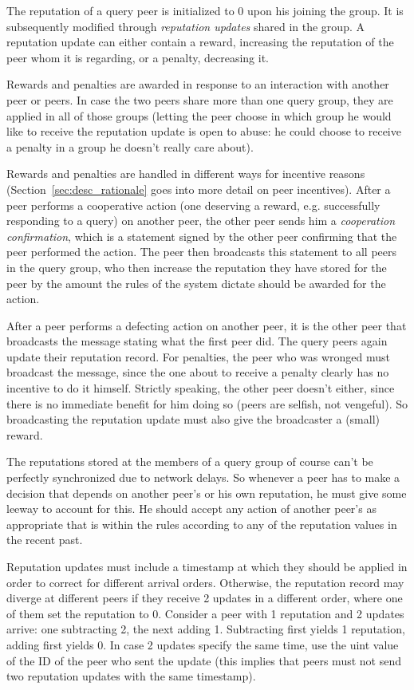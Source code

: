 The reputation of a query peer is initialized to 0 upon his joining the group.
It is subsequently modified through \emph{reputation updates} shared in the
group. A reputation update can either contain a reward, increasing the
reputation of the peer whom it is regarding, or a penalty, decreasing it.

Rewards and penalties are awarded in response to an interaction with another
peer or peers. In case the two peers share more than one query group, they are
applied in all of those groups (letting the peer choose in which group he would
like to receive the reputation update is open to abuse: he could choose to
receive a penalty in a group he doesn't really care about).

Rewards and penalties are handled in different ways for incentive reasons
(Section~\ref{sec:desc_rationale} goes into more detail on peer incentives).
After a peer performs a cooperative action (one deserving a reward, e.g.
successfully responding to a query) on another peer, the other peer sends him a
\emph{cooperation confirmation}, which is a statement signed by the other peer
confirming that the peer performed the action. The peer then broadcasts this
statement to all peers in the query group, who then increase the reputation they
have stored for the peer by the amount the rules of the system dictate should be
awarded for the action.

After a peer performs a defecting action on another peer, it is the other peer
that broadcasts the message stating what the first peer did. The query peers
again update their reputation record. For penalties, the peer who was wronged
must broadcast the message, since the one about to receive a penalty clearly has
no incentive to do it himself. Strictly speaking, the other peer doesn't either,
since there is no immediate benefit for him doing so (peers are selfish, not
vengeful). So broadcasting the reputation update must also give the broadcaster
a (small) reward.

The reputations stored at the members of a query group of course can't be
perfectly synchronized due to network delays. So whenever a peer has to make a
decision that depends on another peer's or his own reputation, he must give some
leeway to account for this. He should accept any action of another peer's as
appropriate that is within the rules according to any of the reputation values
in the recent past.

Reputation updates must include a timestamp at which they should be applied in
order to correct for different arrival orders. Otherwise, the reputation record
may diverge at different peers if they receive 2 updates in a different order,
where one of them set the reputation to 0. Consider a peer with 1 reputation and
2 updates arrive: one subtracting 2, the next adding 1. Subtracting first yields
1 reputation, adding first yields 0. In case 2 updates specify the same time,
use the uint value of the ID of the peer who sent the update (this implies that
peers must not send two reputation updates with the same timestamp).

